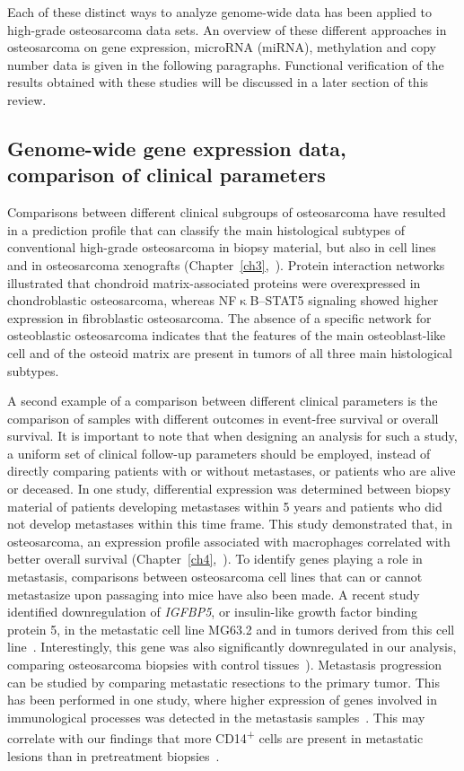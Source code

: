 Each of these distinct ways to analyze genome\hyp{}wide data
has been applied to high\hyp{}grade osteosarcoma data sets. An
overview of these different approaches in osteosarcoma on
gene expression, microRNA (miRNA), methylation and copy
number data is given in the following paragraphs. Functional
verification of the results obtained with these studies will be
discussed in a later section of this review.

\subsection{Genome\hyp{}wide gene expression data, comparison of clinical parameters}
Comparisons between different clinical subgroups of osteosarcoma
have resulted in a prediction profile that can classify
the main histological subtypes of conventional high\hyp{}grade osteosarcoma
in biopsy material, but also in cell lines and in
osteosarcoma xenografts (Chapter~\ref{ch3},~\cite{kuijjer2011mrna}). Protein interaction networks illustrated
that chondroid matrix\hyp{}associated proteins were overexpressed
in chondroblastic osteosarcoma, whereas NF$\upkappa$B--STAT5
signaling showed higher expression in fibroblastic osteosarcoma.
The absence of a specific network for osteoblastic
osteosarcoma indicates that the features of the main osteoblast\hyp{}like
cell and of the osteoid matrix are present in tumors
of all three main histological subtypes.

A second example of a comparison between different clinical
parameters is the comparison of samples with different
outcomes in event\hyp{}free survival or overall survival. It is important
to note that when designing an analysis for such a
study, a uniform set of clinical follow\hyp{}up parameters should
be employed, instead of directly comparing patients with or
without metastases, or patients who are alive or deceased. In
one study, differential expression was determined between biopsy
material of patients developing metastases within 5
years and patients who did not develop metastases within
this time frame. This study demonstrated that, in osteosarcoma,
an expression profile associated with macrophages correlated
with better overall survival (Chapter~\ref{ch4},~\cite{buddingh2011tumor}). To identify genes
playing a role in metastasis, comparisons between osteosarcoma
cell lines that can or cannot metastasize upon passaging
into mice have also been made. A recent study identified
downregulation of {\it IGFBP5}, or insulin\hyp{}like growth factor
binding protein 5, in the metastatic cell line MG63.2 and in
tumors derived from this cell line~\cite{su2011insulin}. Interestingly, this gene
was also significantly downregulated in our analysis, comparing
osteosarcoma biopsies with control tissues~\cite{cleton2009profiling}). Metastasis
progression can be studied by comparing metastatic resections
to the primary tumor. This has been performed in one
study, where higher expression of genes involved in immunological
processes was detected in the metastasis samples~\cite{namlos2012global}.
This may correlate with our findings that more CD14\textsuperscript{+} cells
are present in metastatic lesions than in pretreatment
biopsies~\cite{buddingh2011tumor}.

